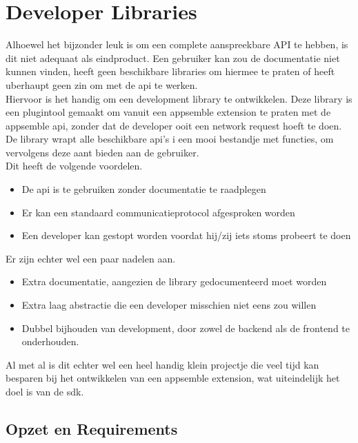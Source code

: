 \chapter{Developer Libraries}

Alhoewel het bijzonder leuk is om een complete aanspreekbare API te hebben, is dit niet adequaat als eindproduct. Een gebruiker kan zou de documentatie niet kunnen vinden, heeft geen beschikbare libraries om hiermee te praten of heeft uberhaupt geen zin om met de api te werken. \\

Hiervoor is het handig om een development library te ontwikkelen. Deze library is een plugintool gemaakt om vanuit een appsemble extension te praten met de appsemble api, zonder dat de developer ooit een network request hoeft te doen. De library wrapt alle beschikbare api's i een mooi bestandje met functies, om vervolgens deze aant bieden aan de gebruiker. \\ 

Dit heeft de volgende voordelen.

\begin{itemize}
	\item De api is te gebruiken zonder documentatie te raadplegen
	\item Er kan een standaard communicatieprotocol afgesproken worden
	\item Een developer kan gestopt worden voordat hij/zij iets stoms probeert te doen
\end{itemize}

Er zijn echter wel een paar nadelen aan.

\begin{itemize}
	\item Extra documentatie, aangezien de library gedocumenteerd moet worden
	\item Extra laag abstractie die een developer misschien niet eens zou willen
	\item Dubbel bijhouden van development, door zowel de backend als de frontend te onderhouden.
\end{itemize}

Al met al is dit echter wel een heel handig klein projectje die veel tijd kan besparen bij het ontwikkelen van een appsemble extension, wat uiteindelijk het doel is van de sdk. \\

\section{Opzet en Requirements}

